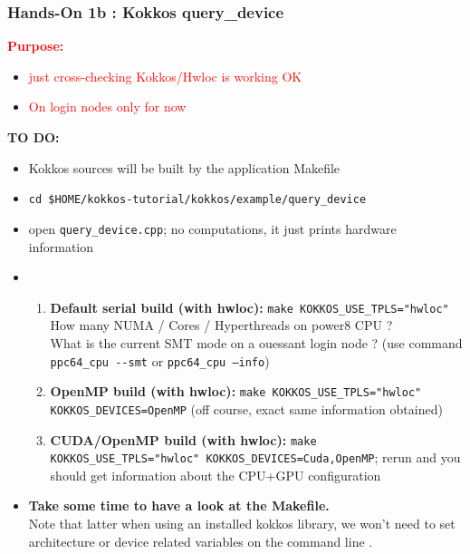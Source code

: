 \begin{frame}[fragile=singleslide]
  \frametitle{Hands-On 1b : Kokkos query\_device}

  {\large\textcolor{red}{\textbf{Purpose:}}}
  \begin{itemize}
  \item \textcolor{red}{just cross-checking Kokkos/Hwloc is working OK}
  \item \textcolor{red}{On login nodes only for now}
  \end{itemize}
    
  {\bf TO DO:}
  \begin{itemize}
  \item Kokkos sources will be built by the application Makefile
  \item \texttt{cd \$HOME/kokkos-tutorial/kokkos/example/query\_device}
  \item open \texttt{query\_device.cpp}; no computations, it just prints hardware information
  \item 
    \begin{enumerate}
    \item \textbf{Default serial build (with hwloc):} \texttt{make KOKKOS\_USE\_TPLS="hwloc"}\\
      How many NUMA / Cores / Hyperthreads on power8 CPU ?\\
      What is the current SMT mode on a ouessant login node ? (use command \texttt{ppc64\_cpu \--\--smt} or \texttt{ppc64\_cpu --info})
    \item \textbf{OpenMP build (with hwloc):} \texttt{make KOKKOS\_USE\_TPLS="hwloc" KOKKOS\_DEVICES=OpenMP} (off course, exact same information obtained)
    \item \textbf{CUDA/OpenMP build (with hwloc):} \texttt{make KOKKOS\_USE\_TPLS="hwloc" KOKKOS\_DEVICES=Cuda,OpenMP}; rerun and you should get information about the CPU+GPU configuration
    \end{enumerate}
  \item \textbf{Take some time to have a look at the Makefile.}\\
    Note that latter when using an installed kokkos library, we won't need to set architecture or device related variables on the command line .
  \end{itemize}

\end{frame}

